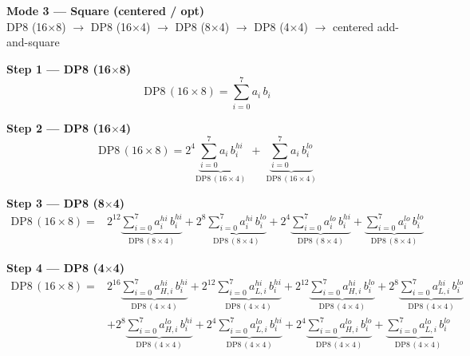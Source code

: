 \documentclass[fleqn]{article}
\newcommand{\DPop}[3]{\mathrm{DP#1}\,(#2\!\times\!#3)}
\begin{document}
\begin{center}
{\LARGE \textbf{Mode 3 --- Square (centered / opt)}}\\[4pt]
{\large DP8 (16$\times$8) $\rightarrow$ DP8 (16$\times$4) $\rightarrow$ DP8 (8$\times$4) $\rightarrow$ DP8 (4$\times$4) $\rightarrow$ centered add-and-square}
\end{center}

\textbf{Step 1 --- DP8 (16$\times$8)}
\[ \DPop{8}{16}{8} = \sum_{i=0}^{7} a_i \, b_i \]

\textbf{Step 2 --- DP8 (16$\times$4)}
\[
\DPop{8}{16}{8}
  = 2^{4}\underbrace{\sum_{i=0}^{7} a_i \, b_i^{hi}}_{\DPop{8}{16}{4}}
  \; + \; \underbrace{\sum_{i=0}^{7} a_i \, b_i^{lo}}_{\DPop{8}{16}{4}}
\]

\textbf{Step 3 --- DP8 (8$\times$4)}
\begin{align*}
\DPop{8}{16}{8} = {}
  & 2^{12}\underbrace{\sum_{i=0}^{7} a_i^{hi} \, b_i^{hi}}_{\DPop{8}{8}{4}}
  + 2^{8}\underbrace{\sum_{i=0}^{7} a_i^{hi} \, b_i^{lo}}_{\DPop{8}{8}{4}}
  + 2^{4}\underbrace{\sum_{i=0}^{7} a_i^{lo} \, b_i^{hi}}_{\DPop{8}{8}{4}}
  + \underbrace{\sum_{i=0}^{7} a_i^{lo} \, b_i^{lo}}_{\DPop{8}{8}{4}}
\end{align*}

\textbf{Step 4 --- DP8 (4$\times$4)}
\begin{align*}
\DPop{8}{16}{8} = {}
  & 2^{16}\underbrace{\sum_{i=0}^{7} a_{H,i}^{hi}\, b_i^{hi}}_{\DPop{8}{4}{4}}
  + 2^{12}\underbrace{\sum_{i=0}^{7} a_{L,i}^{hi}\, b_i^{hi}}_{\DPop{8}{4}{4}}
  + 2^{12}\underbrace{\sum_{i=0}^{7} a_{H,i}^{hi}\, b_i^{lo}}_{\DPop{8}{4}{4}}
  + 2^{8}\underbrace{\sum_{i=0}^{7} a_{L,i}^{hi}\, b_i^{lo}}_{\DPop{8}{4}{4}} \\[0.6em]
  & + 2^{8}\underbrace{\sum_{i=0}^{7} a_{H,i}^{lo}\, b_i^{hi}}_{\DPop{8}{4}{4}}
  + 2^{4}\underbrace{\sum_{i=0}^{7} a_{L,i}^{lo}\, b_i^{hi}}_{\DPop{8}{4}{4}}
  + 2^{4}\underbrace{\sum_{i=0}^{7} a_{H,i}^{lo}\, b_i^{lo}}_{\DPop{8}{4}{4}}
  + \underbrace{\sum_{i=0}^{7} a_{L,i}^{lo}\, b_i^{lo}}_{\DPop{8}{4}{4}}
\end{align*}
\end{document}

